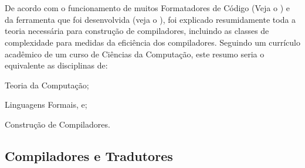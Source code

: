 

\chapter{}
\label{chapter:fundamentacaoTeorica}

De acordo com o funcionamento de muitos Formatadores de Código (Veja o ) e
da ferramenta que foi desenvolvida (veja o ),
foi explicado resumidamente toda a teoria necessária para construção de compiladores,
incluindo as classes de complexidade para medidas da eficiência dos compiladores.
Seguindo um currículo acadêmico de um curso de Ciências da Computação,
este resumo seria o equivalente as disciplinas de:
\begin{inparaenum}[1)]
\item Teoria da Computação;
\item Linguagens Formais, e;
\item Construção de Compiladores.
\end{inparaenum}%


\section{Compiladores e Tradutores}
\label{section:compiladoresEtradutores}

